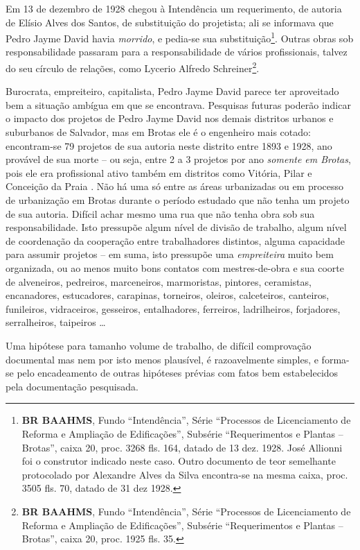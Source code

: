 Em 13 de dezembro de 1928 chegou à Intendência um requerimento, de autoria de Elísio Alves dos Santos, de substituição do projetista; ali se informava que Pedro Jayme David havia \textit{morrido}, e pedia-se sua substituição\footnote{\textbf{BR BAAHMS}, Fundo ``Intendência'', Série ``Processos de Licenciamento de Reforma e Ampliação de Edificações'', Subsérie ``Requerimentos e Plantas – Brotas'', caixa 20, proc. 3268 fls. 164, datado de 13 dez. 1928. José Allionni foi o construtor indicado neste caso. Outro documento de teor semelhante protocolado por Alexandre Alves da Silva encontra-se na mesma caixa, proc. 3505 fls. 70, datado de 31 dez 1928.}. Outras obras sob responsabilidade passaram para a responsabilidade de vários profissionais, talvez do seu círculo de relações, como Lycerio Alfredo Schreiner\footnote{\textbf{BR BAAHMS}, Fundo ``Intendência'', Série ``Processos de Licenciamento de Reforma e Ampliação de Edificações'', Subsérie ``Requerimentos e Plantas – Brotas'', caixa 20, proc. 1925 fls. 35.}.

Burocrata, empreiteiro, capitalista, Pedro Jayme David parece ter aproveitado bem a situação ambígua em que se encontrava. Pesquisas futuras poderão indicar o impacto dos projetos de Pedro Jayme David nos demais distritos urbanos e suburbanos de Salvador, mas em Brotas ele é o engenheiro mais cotado: encontram-se 79 projetos de sua autoria neste distrito entre 1893 e 1928, ano provável de sua morte -- ou seja, entre 2 a 3 projetos por ano \textit{somente em Brotas}, pois ele era profissional ativo também em distritos como Vitória, Pilar e Conceição da Praia \cite{almeida_victoria_1997, almeida_vitrinescomercio_2014}. Não há uma só entre as áreas urbanizadas ou em processo de urbanização em Brotas durante o período estudado que não tenha um projeto de sua autoria. Difícil achar mesmo uma rua que não tenha obra sob sua responsabilidade. Isto pressupõe algum nível de divisão de trabalho, algum nível de coordenação da cooperação entre trabalhadores distintos, alguma capacidade para assumir projetos -- em suma, isto pressupõe uma \textit{empreiteira} muito bem organizada, ou ao menos muito bons contatos com mestres-de-obra e sua coorte de alveneiros, pedreiros, marceneiros, marmoristas, pintores, ceramistas, encanadores, estucadores, carapinas, torneiros, oleiros, calceteiros, canteiros, funileiros, vidraceiros, gesseiros, entalhadores, ferreiros, ladrilheiros,  forjadores, serralheiros, taipeiros \dots

Uma hipótese para tamanho volume de trabalho, de difícil comprovação documental mas nem por isto menos plausível, é razoavelmente simples, e forma-se pelo encadeamento de outras hipóteses prévias com fatos bem estabelecidos pela documentação pesquisada. 

